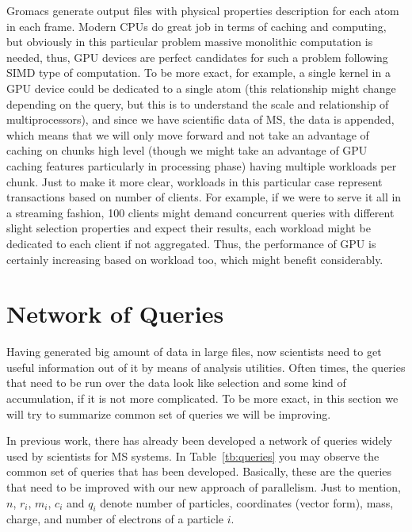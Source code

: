\documentclass[11pt,a4paper]{report}
\begin{document}
Gromacs generate output files with physical properties description for each atom in each frame. Modern CPUs do great job in terms of caching and computing, but obviously in this particular problem massive monolithic computation is needed, thus, GPU devices are perfect candidates for such a problem following SIMD type of computation. To be more exact, for example, a single kernel in a GPU device could be dedicated to a single atom (this relationship might change depending on the query, but this is to understand the scale and relationship of multiprocessors), and since we have scientific data of MS, the data is appended, which means that we will only move forward and not take an advantage of caching on chunks high level (though we might take an advantage of GPU caching features particularly in processing phase) having multiple workloads per chunk. Just to make it more clear, workloads in this particular case represent transactions based on number of clients. For example, if we were to serve it all in a streaming fashion, 100 clients might demand concurrent queries with different slight selection properties and expect their results, each workload might be dedicated to each client if not aggregated. Thus, the performance of GPU is certainly increasing based on workload too, which might benefit considerably.


\chapter{Network of Queries}\label{sc:querynetwork}
Having generated big amount of data in large files, now scientists need to get useful information out of it by means of analysis utilities. Often times, the queries that need to be run over the data look like selection and some kind of accumulation, if it is not more complicated. To be more exact, in this section we will try to summarize common set of queries we will be improving. 

In previous work, there has already been developed a network of queries widely used by scientists for MS systems. In Table~\ref{tb:queries} you may observe the common set of queries that has been developed. Basically, these are the queries that need to be improved with our new approach of parallelism. Just to mention, $n$, $r_i$, $m_i$, $c_i$ and $q_i$ denote number of particles, coordinates (vector form), mass, charge, and number of electrons of a particle $i$.
\end{document}
